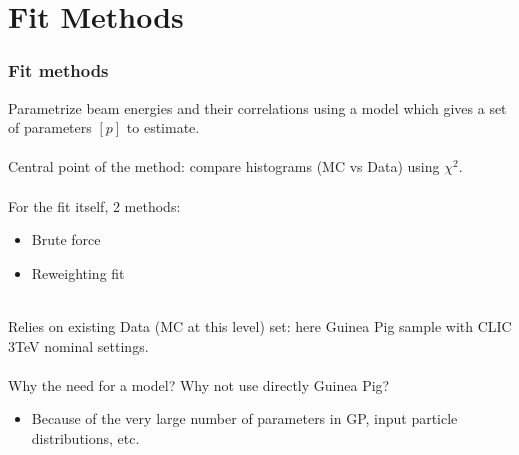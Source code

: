\documentclass{beamer}
\begin{document}
\section{Fit Methods}
\begin{frame}
\frametitle{Fit methods}
Parametrize beam energies and their \alert{correlations} using a model which
gives a set of \alert{parameters $[p]$} to estimate. \\
~\\
Central point of the method: compare histograms (MC vs Data) using $\chi^2$. \\
~\\
For the fit itself, 2 methods:
\begin{itemize}
  \item Brute force
  \item Reweighting fit
\end{itemize}
~\\
Relies on existing \alert{Data} (MC at this level) set: here Guinea Pig sample
with CLIC 3TeV nominal settings.\\
~\\
Why the need for a model? Why not use directly Guinea Pig?
\begin{itemize}
  \item Because of the very large number of parameters in GP, input particle
  distributions, etc.
\end{itemize}
\end{frame}
\end{document}
